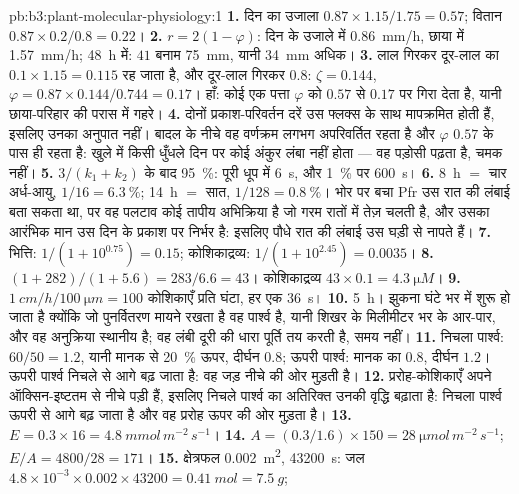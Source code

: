 \begin{solution}{pb:b3:plant-molecular-physiology:1}
\textbf{1.} दिन का उजाला $0.87\times 1.15/1.75 = 0.57$; वितान $0.87\times
0.2/0.8 = 0.22$।
\textbf{2.} $r = 2(1 - \varphi)$: दिन के उजाले में \qty{0.86}{mm/h},
छाया में \qty{1.57}{mm/h}; \qty{48}{h} में: $41$ बनाम \qty{75}{mm},
यानी \qty{34}{mm} अधिक।
\textbf{3.} लाल गिरकर दूर-लाल का $0.1\times 1.15 = 0.115$ रह जाता है,
और दूर-लाल गिरकर $0.8$: $\zeta = 0.144$, $\varphi = 0.87\times 0.144/0.744 =
0.17$। हाँ: कोई एक पत्ता $\varphi$ को $0.57$ से $0.17$ पर गिरा देता है,
यानी छाया-परिहार की परास में गहरे।
\textbf{4.} दोनों प्रकाश-परिवर्तन दरें उस फ्लक्स के साथ मापक्रमित होती
हैं, इसलिए उनका अनुपात नहीं। बादल के नीचे वह वर्णक्रम लगभग अपरिवर्तित
रहता है और $\varphi$ $0.57$ के पास ही रहता है: खुले में किसी धुँधले दिन
पर कोई अंकुर लंबा नहीं होता --- वह पड़ोसी पढ़ता है, चमक नहीं।
\textbf{5.} $3/(k_{1} + k_{2})$ के बाद \qty{95}{\%}: पूरी धूप में
\qty{6}{s}, और \qty{1}{\%} पर \qty{600}{s}।
\textbf{6.} \qty{8}{h} $=$ चार अर्ध-आयु, $1/16 = \qty{6.3}{\%}$;
\qty{14}{h} $=$ सात, $1/128 = \qty{0.8}{\%}$। भोर पर बचा Pfr उस रात की
लंबाई बता सकता था, पर वह पलटाव कोई तापीय अभिक्रिया है जो गरम रातों में
तेज़ चलती है, और उसका आरंभिक मान उस दिन के प्रकाश पर निर्भर है: इसलिए
पौधे रात की लंबाई उस घड़ी से नापते हैं।
\textbf{7.} भित्ति: $1/(1 + 10^{0.75}) = 0.15$; कोशिकाद्रव्य: $1/(1 +
10^{2.45}) = 0.0035$।
\textbf{8.} $(1 + 282)/(1 + 5.6) = 283/6.6 = 43$। कोशिकाद्रव्य
$43\times 0.1 = \qty{4.3}{\micro M}$।
\textbf{9.} $\qty{1}{cm/h}/\qty{100}{\micro m} = 100$ कोशिकाएँ प्रति
घंटा, हर एक \qty{36}{s}।
\textbf{10.} \qty{5}{h}। झुकना घंटे भर में शुरू हो जाता है क्योंकि जो
पुनर्वितरण मायने रखता है वह पार्श्व है, यानी शिखर के मिलीमीटर भर के
आर-पार, और वह अनुक्रिया स्थानीय है; वह लंबी दूरी की धारा पूर्ति तय करती
है, समय नहीं।
\textbf{11.} निचला पार्श्व: $60/50 = 1.2$, यानी  मानक से
\qty{20}{\%} ऊपर, दीर्घन $0.8$; ऊपरी पार्श्व: मानक का $0.8$, दीर्घन
$1.2$। ऊपरी पार्श्व निचले से आगे बढ़ जाता है: वह जड़ नीचे की ओर मुड़ती
है।
\textbf{12.} प्ररोह-कोशिकाएँ अपने ऑक्सिन-इष्टतम से नीचे पड़ी हैं, इसलिए
निचले पार्श्व का अतिरिक्त  उनकी वृद्धि बढ़ाता है: निचला पार्श्व
ऊपरी से आगे बढ़ जाता है और वह प्ररोह ऊपर की ओर मुड़ता है।
\textbf{13.} $E = 0.3\times 16 = \qty{4.8}{mmol\,m^{-2}\,s^{-1}}$।
\textbf{14.} $A = (0.3/1.6)\times 150 = \qty{28}{\micro mol\,m^{-2}\,s^{-1}}$;
$E/A = 4800/28 = 171$।
\textbf{15.} क्षेत्रफल \qty{0.002}{m^2}, \num{43200}~s: जल $4.8\times
10^{-3}\times 0.002\times\num{43200} = \qty{0.41}{mol} = \qty{7.5}{g}$;

\end{solution}
